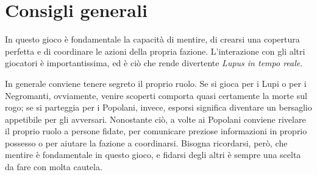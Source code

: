\documentclass[a4paper,10pt]{article}
\begin{document}
% 
% 

\section{Consigli generali}

In questo gioco è fondamentale la capacità di mentire, di crearsi una copertura perfetta e di coordinare le azioni della propria fazione. L'interazione con gli altri
giocatori è importantissima, ed è ciò che rende divertente \emph{Lupus in tempo reale}.

In generale conviene tenere segreto il proprio ruolo. Se si gioca per i Lupi o per i Negromanti, ovviamente, venire scoperti comporta quasi certamente la morte sul rogo; se si parteggia per i Popolani, invece, esporsi significa diventare un bersaglio appetibile per gli avversari.
Nonostante ciò, a volte ai Popolani conviene rivelare il proprio ruolo a persone fidate, per comunicare preziose informazioni in proprio possesso o per aiutare la fazione a coordinarsi. Bisogna ricordarsi, però, che mentire è fondamentale in questo gioco, e fidarsi degli altri è sempre una scelta da fare con molta cautela.
\end{document}
